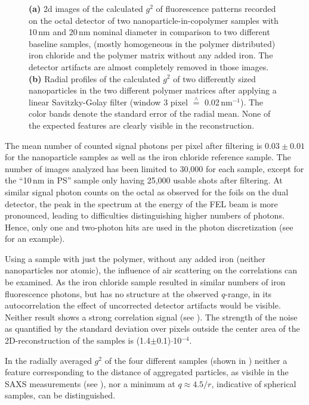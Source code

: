 \begin{figure}
	\caption[Results nanoparticles]{\textbf{(a)} 2d images of the calculated $g^2$ of fluorescence patterns recorded on the octal detector of two nanoparticle-in-copolymer samples with 10\,nm and 20\,nm nominal diameter in comparison to two different baseline samples, (mostly homogeneous in the polymer distributed) iron chloride and the polymer matrix without any added iron. The detector artifacts are almost completely removed in those images. \textbf{(b)} Radial profiles of the calculated $g^2$ of two differently sized nanoparticles in the two different polymer matrices after applying a linear Savitzky-Golay filter (window 3 pixel $\overset{\scriptscriptstyle\wedge}{=}$ 0.02\,nm$^{-1}$). The color bands denote the standard error of the radial mean. None of the expected features are clearly visible in the reconstruction. }
\end{figure}

The mean number of counted signal photons per pixel after filtering is $0.03\pm0.01$ for the nanoparticle samples as well as the iron chloride reference sample. The number of images analyzed has been limited to 30,000 for each sample, except for the \enquote{10\,nm in PS} sample only having 25,000 usable shots after filtering. At similar signal photon counts on the octal as observed for the foils on the dual detector, the peak in the spectrum at the energy of the FEL beam is more pronounced, leading to difficulties distinguishing higher numbers of photons. Hence, only one and two-photon hits are used in the photon discretization (see  for an example).

Using a sample with just the polymer, without any added iron (neither nanoparticles nor atomic), the influence of air scattering on the correlations can be examined. As the iron chloride sample resulted in similar numbers of iron fluorescence photons, but has no structure at the observed $q$-range, in its autocorrelation the effect of uncorrected detector artifacts would be visible. Neither result shows a strong correlation signal (see ). The strength of the noise as quantified by the standard deviation over pixels outside the center area of the 2D-reconstruction of the samples is (1.4$\pm$0.1)$\cdot$10$^{-4}$.

In the radially averaged $g^2$ of the four different samples (shown in ) neither a feature corresponding to the distance of aggregated particles, as visible in the SAXS measurements (see ), nor a minimum at $q\approx4.5/r$, indicative of spherical samples, can be distinguished. 
\FloatBarrier

